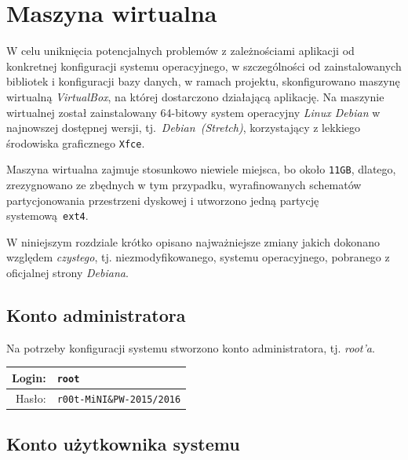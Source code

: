 \documentclass[a4paper,titlepage]{article}
\theoremstyle{break}
\numberwithin{equation}{subsection}
\begin{document}

\section{Maszyna wirtualna}
\label{sec:maszyna-wirtualna}

W celu uniknięcia potencjalnych problemów z zależnościami aplikacji od konkretnej konfiguracji systemu operacyjnego, w szczególności od zainstalowanych bibliotek i konfiguracji bazy danych, w ramach projektu, skonfigurowano maszynę wirtualną \emph{VirtualBox}, na której dostarczono działającą aplikację. Na maszynie wirtualnej został zainstalowany 64-bitowy system operacyjny \emph{Linux Debian} w najnowszej dostępnej wersji, tj.~\emph{Debian~(Stretch)}, korzystający z lekkiego środowiska graficznego \texttt{Xfce}.

Maszyna wirtualna zajmuje stosunkowo niewiele miejsca, bo około \texttt{11GB}, dlatego, zrezygnowano ze zbędnych w tym przypadku, wyrafinowanych schematów partycjonowania przestrzeni dyskowej i utworzono jedną partycję systemową~\texttt{ext4}.

W niniejszym rozdziale krótko opisano najważniejsze zmiany jakich dokonano względem \emph{czystego}, tj. niezmodyfikowanego, systemu operacyjnego, pobranego z oficjalnej strony \emph{Debiana}.


\subsection{Konto administratora}

Na potrzeby konfiguracji systemu stworzono konto administratora, tj. \emph{root'a}.

\begin{tabular}{r|l}
Login: & \texttt{root}\\
\hline
Hasło: & \texttt{r00t-MiNI\&PW-2015/2016}\\
\end{tabular}


\subsection{Konto użytkownika systemu}
\end{document}
